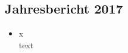 \subsection{Jahresbericht 2017}
\begin{history}


    \begin{itemize}

        \item[]x\\
        text

    \end{itemize}

\end{history}
